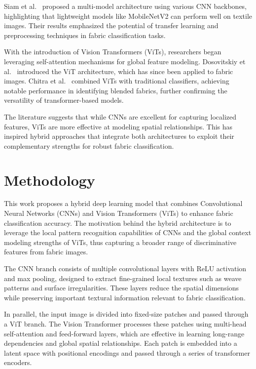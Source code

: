 Siam et al.~\cite{siam2021textilenet} proposed a multi-model architecture using various CNN backbones, highlighting that lightweight models like MobileNetV2 can perform well on textile images. Their results emphasized the potential of transfer learning and preprocessing techniques in fabric classification tasks.

With the introduction of Vision Transformers (ViTs), researchers began leveraging self-attention mechanisms for global feature modeling. Dosovitskiy et al.~\cite{dosovitskiy2020vit} introduced the ViT architecture, which has since been applied to fabric images. Chitra et al.~\cite{chitra2022vit} combined ViTs with traditional classifiers, achieving notable performance in identifying blended fabrics, further confirming the versatility of transformer-based models.

The literature suggests that while CNNs are excellent for capturing localized features, ViTs are more effective at modeling spatial relationships. This has inspired hybrid approaches that integrate both architectures to exploit their complementary strengths for robust fabric classification.

\section*{Methodology}

This work proposes a hybrid deep learning model that combines Convolutional Neural Networks (CNNs) and Vision Transformers (ViTs) to enhance fabric classification accuracy. The motivation behind the hybrid architecture is to leverage the local pattern recognition capabilities of CNNs and the global context modeling strengths of ViTs, thus capturing a broader range of discriminative features from fabric images.

The CNN branch consists of multiple convolutional layers with ReLU activation and max pooling, designed to extract fine-grained local textures such as weave patterns and surface irregularities. These layers reduce the spatial dimensions while preserving important textural information relevant to fabric classification.

In parallel, the input image is divided into fixed-size patches and passed through a ViT branch. The Vision Transformer processes these patches using multi-head self-attention and feed-forward layers, which are effective in learning long-range dependencies and global spatial relationships. Each patch is embedded into a latent space with positional encodings and passed through a series of transformer encoders.

